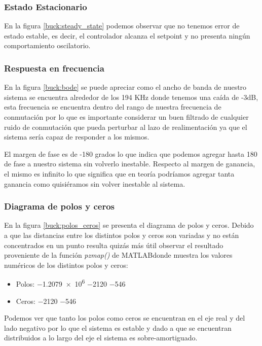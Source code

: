 \documentclass[12pt]{report}
\begin{document}
	\subsubsection{Estado Estacionario}
	
	En la figura \ref{buck:steady_state} podemos observar que no tenemos error de estado estable, es decir, el controlador alcanza el setpoint y no presenta ningún comportamiento oscilatorio.
	
	\subsubsection{Respuesta en frecuencia}

	En la figura \ref{buck:bode} se puede apreciar como el ancho de banda de nuestro sistema se encuentra alrededor de los 194 KHz donde tenemos una caída de -3dB, esta frecuencia se encuentra dentro del rango de nuestra frecuencia de conmutación por lo que es importante considerar un buen filtrado de cualquier ruido de conmutación que pueda perturbar al lazo de realimentación ya que el sistema sería capaz de responder a los mismos.
	
	El margen de fase es de -180 grados lo que indica que podemos agregar hasta 180 de fase a nuestro sistema sin volverlo inestable. Respecto al margen de ganancia, el mismo es infinito lo que significa que en teoría podríamos agregar tanta ganancia como quisiéramos sin volver inestable al sistema.
	
	\subsubsection{Diagrama de polos y ceros}

	En la figura \ref{buck:polos_ceros} se presenta el diagrama de polos y ceros. Debido a que las distancias entre los distintos polos y ceros son variadas y no están concentrados en un punto resulta quizás más útil observar el resultado proveniente de la función \textit{pzmap()} de MATLAB\textregistered donde muestra los valores numéricos de los distintos polos y ceros:
	
	\begin{itemize}
		\item Polos:
			\subitem \num{-1.2079e6}
			\subitem \num{-2120}
			\subitem \num{-546}
		\item Ceros:
			\subitem \num{-2120}
			\subitem \num{-546}
	\end{itemize}
	
	Podemos ver que tanto los polos como ceros se encuentran en el eje real y del lado negativo por lo que el sistema es estable y dado a que se encuentran distribuidos a lo largo del eje el sistema es sobre-amortiguado.
	
\end{document}
